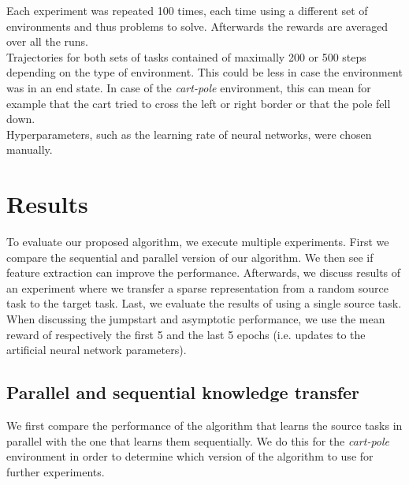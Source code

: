 Each experiment was repeated 100 times, each time using a different set of environments and thus problems to solve.
Afterwards the rewards are averaged over all the runs.\\
Trajectories for both sets of tasks contained of maximally 200 or 500 steps depending on the type of environment.
This could be less in case the environment was in an end state.
In case of the \emph{cart-pole} environment, this can mean for example that the cart tried to cross the left or right border or that the pole fell down.\\
Hyperparameters, such as the learning rate of neural networks, were chosen manually.

\section{Results}
To evaluate our proposed algorithm, we execute multiple experiments. First we compare the sequential and parallel version of our algorithm. We then see if feature extraction can improve the performance. Afterwards, we discuss results of an experiment where we transfer a sparse representation from a random source task to the target task. Last, we evaluate the results of using a single source task.\\
When discussing the jumpstart and asymptotic performance, we use the mean reward of respectively the first 5 and the last 5 epochs (i.e. updates to the artificial neural network parameters).

\subsection{Parallel and sequential knowledge transfer} %
\label{sub:parallel_and_sequential_knowledge_transfer}
We first compare the performance of the algorithm that learns the source tasks in parallel with the one that learns them sequentially. We do this for the \emph{cart-pole} environment in order to determine which version of the algorithm to use for further experiments.

